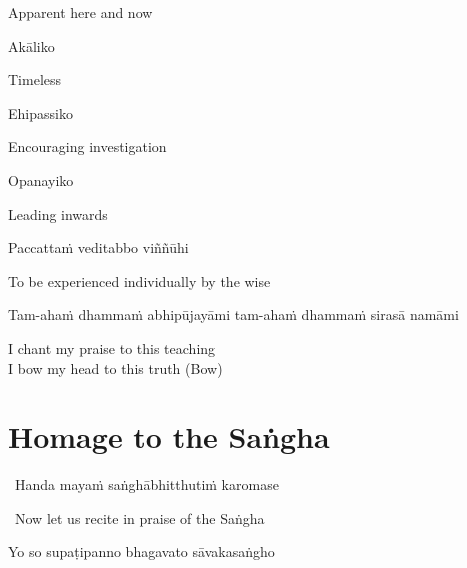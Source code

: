 \begin{english}
  Apparent here and now
\end{english}

Akāliko

\begin{english}
  Timeless
\end{english}

Ehipassiko

\begin{english}
  Encouraging investigation
\end{english}

Opanayiko

\begin{english}
  Leading inwards
\end{english}

Paccattaṁ veditabbo viññūhi

\begin{english}
  To be experienced individually by the wise
\end{english}

\begin{pali-hang}
  Tam-ahaṁ dhammaṁ abhipūjayāmi tam-ahaṁ dhammaṁ sirasā namāmi
\end{pali-hang}

\begin{english}
  I chant my praise to this teaching\\
  I bow my head to this truth \hfill{(Bow)}
\end{english}

\section{Homage to the Saṅgha}
\label{homage-sangha}

\begin{leader}
  \anglebracketleft\ \hspace{-0.5mm}Handa mayaṁ saṅghābhitthutiṁ karomase \hspace{-0.5mm}\anglebracketright\
\end{leader}
\begin{leader-english-belowpali}
  \anglebracketleft\ \hspace{-0.5mm}Now let us recite in praise of the Saṅgha \hspace{-0.5mm}\anglebracketright\
\end{leader-english-belowpali}

Yo so supaṭipanno bhagavato sāvakasaṅgho

